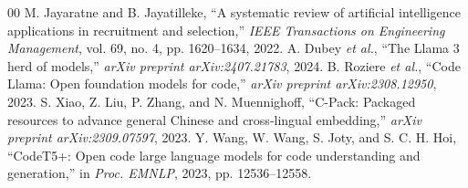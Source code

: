 \documentclass[conference]{IEEEtran}
\begin{document}
\begin{thebibliography}{00}
 M. Jayaratne and B. Jayatilleke, ``A systematic review of artificial intelligence applications in recruitment and selection,'' \textit{IEEE Transactions on Engineering Management}, vol. 69, no. 4, pp. 1620--1634, 2022.
 A. Dubey \textit{et al.}, ``The Llama 3 herd of models,'' \textit{arXiv preprint arXiv:2407.21783}, 2024.
 B. Roziere \textit{et al.}, ``Code Llama: Open foundation models for code,'' \textit{arXiv preprint arXiv:2308.12950}, 2023.
 S. Xiao, Z. Liu, P. Zhang, and N. Muennighoff, ``C-Pack: Packaged resources to advance general Chinese and cross-lingual embedding,'' \textit{arXiv preprint arXiv:2309.07597}, 2023.
 Y. Wang, W. Wang, S. Joty, and S. C. H. Hoi, ``CodeT5+: Open code large language models for code understanding and generation,'' in \textit{Proc. EMNLP}, 2023, pp. 12536--12558.
\end{thebibliography}
\end{document}
